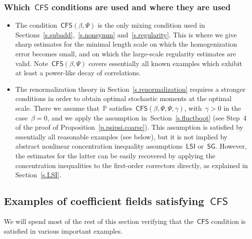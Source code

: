 \documentclass[11pt]{article} %
\numberwithin{equation}{section}
\theoremstyle{definition}
\renewcommand{\P}{\mathbb{P}}
\newcommand{\CFS}{\mathsf{CFS}}
\newcommand{\LSI}{\mathsf{LSI}}
\newcommand{\SG}{\mathsf{SG}}
\begin{document}
\subsubsection{Which~$\CFS$ conditions are used and where they are used}

\begin{itemize}
\item The condition~$\CFS(\beta,\Psi)$ is the only mixing condition used in Sections~\ref{s.subadd},~\ref{s.nonsymm} and~\ref{s.regularity}. 
This is where we give sharp estimates for the minimal length scale on which the  homogenization error becomes small, and on which the large-scale regularity estimates are valid. Note~$\CFS(\beta,\Psi)$ covers essentially all known examples which exhibit at least a power-like decay of correlations.  

\item The renormalization theory in Section~\ref{s.renormalization} requires a stronger conditions in order to obtain optimal stochastic moments at the optimal scale. There we assume that~$\P$ satisfies~$\CFS(\beta,\Psi,\Psi,\gamma)$, with~$\gamma>0$ in the case~$\beta=0$, and we apply the assumption in~Section~\ref{s.fluctboot} (see Step~4 of the proof of Proposition~\ref{p.psipsi.coarse}). This assumption is satisfied by essentially all reasonable examples (see below), but it is not implied by abstract nonlinear concentration inequality assumptions~$\LSI$ or~$\SG$. However, the estimates for the latter can be easily recovered by applying the concentration inequalities to the first-order correctors directly, as explained in Section~\ref{s.LSI}. 
\end{itemize}





\subsection{Examples of coefficient fields satisfying~\texorpdfstring{$\CFS$}{{CFS}}}

We will spend most of the rest of this section verifying that the~$\CFS$ condition is satisfied in various important examples.
\end{document}
